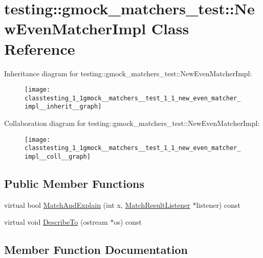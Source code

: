 \hypertarget{classtesting_1_1gmock__matchers__test_1_1_new_even_matcher_impl}{}\section{testing\+:\+:gmock\+\_\+matchers\+\_\+test\+:\+:New\+Even\+Matcher\+Impl Class Reference}
\label{classtesting_1_1gmock__matchers__test_1_1_new_even_matcher_impl}


Inheritance diagram for testing\+:\+:gmock\+\_\+matchers\+\_\+test\+:\+:New\+Even\+Matcher\+Impl\+:
\nopagebreak
\begin{figure}[H]
\begin{center}
\leavevmode
\texttt{[image: classtesting\_1\_1gmock\_\_matchers\_\_test\_1\_1\_new\_even\_matcher\_impl\_\_inherit\_\_graph]}
\end{center}
\end{figure}


Collaboration diagram for testing\+:\+:gmock\+\_\+matchers\+\_\+test\+:\+:New\+Even\+Matcher\+Impl\+:
\nopagebreak
\begin{figure}[H]
\begin{center}
\leavevmode
\texttt{[image: classtesting\_1\_1gmock\_\_matchers\_\_test\_1\_1\_new\_even\_matcher\_impl\_\_coll\_\_graph]}
\end{center}
\end{figure}
\subsection*{Public Member Functions}
\begin{DoxyCompactItemize}
\item 
virtual bool \hyperlink{classtesting_1_1gmock__matchers__test_1_1_new_even_matcher_impl_ae09c1c6d46be8b229f271571cd4df53f}{Match\+And\+Explain} (int x, \hyperlink{classtesting_1_1_match_result_listener}{Match\+Result\+Listener} $\ast$listener) const 
\item 
virtual void \hyperlink{classtesting_1_1gmock__matchers__test_1_1_new_even_matcher_impl_a28f634d1b39d1d7a9008b29068e98ce2}{Describe\+To} (ostream $\ast$os) const 
\end{DoxyCompactItemize}


\subsection{Member Function Documentation}
